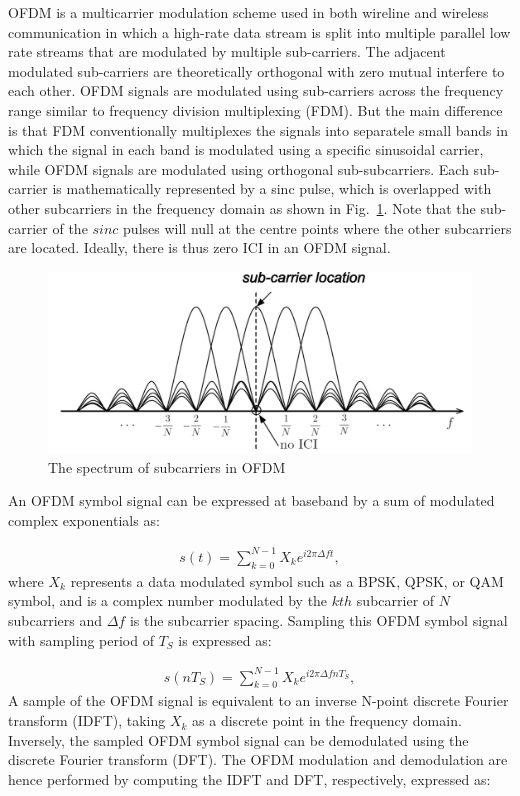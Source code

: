 OFDM is a multicarrier modulation scheme used in both wireline and wireless communication in which a high-rate data stream is split into multiple parallel low rate streams that are modulated by multiple sub-carriers.
The adjacent modulated sub-carriers are theoretically orthogonal with zero mutual interfere to each other.
OFDM signals are modulated using sub-carriers across the frequency range similar to frequency division multiplexing (FDM). 
But the main difference is that FDM conventionally multiplexes the signals into separatele small bands in which the signal in each band is modulated using a specific sinusoidal carrier, while OFDM signals are modulated using orthogonal sub-subcarriers. 
Each sub-carrier is mathematically represented by a sinc pulse, which is overlapped with other subcarriers in the frequency domain as shown in Fig.~\ref{fig:OFDM-subcarrier}.
Note that the sub-carrier of the $sinc$ pulses will null at the centre points where the other subcarriers are located. Ideally, there is thus zero ICI in an OFDM signal. 

\begin{figure}
	\centerline{\includegraphics [width=0.8\columnwidth] {Figures/OFDM-subcarrier.pdf} }
	\caption{The spectrum of subcarriers in OFDM \cite{farhang2008signal}}
	\label{fig:OFDM-subcarrier}
\end{figure}

An OFDM symbol signal can be expressed at baseband by a sum of modulated complex exponentials as:

\begin{eqnarray}
\label{equ:OFDMsignal}
s(t) = \sum_{k=0}^{N-1} X_k e^{i2\pi\Delta ft},
\end{eqnarray}
where $X_{k}$ represents a data modulated symbol such as a BPSK, QPSK, or QAM symbol, and is a complex number modulated by the $kth$ subcarrier of $N$ subcarriers and $\Delta f$ is the subcarrier spacing. 
Sampling this OFDM symbol signal with sampling period of $T_S$ is expressed as:

\begin{eqnarray}
\label{equ:sampledOFDMsignal}
s(nT_S) = \sum_{k=0}^{N-1} X_k e^{i2\pi\Delta fnT_S},
\end{eqnarray}
A sample of the OFDM signal is equivalent to an inverse N-point discrete Fourier transform (IDFT), taking $X_{k}$ as a discrete point in the frequency domain. 
Inversely, the sampled OFDM symbol signal can be demodulated using the discrete Fourier transform (DFT). The OFDM modulation and demodulation are hence performed by computing the IDFT and DFT, respectively, expressed as:

